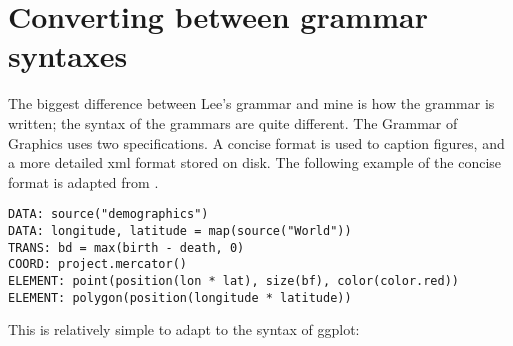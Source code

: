 
\section{Converting between grammar syntaxes}

The biggest difference between Lee's grammar and mine is how the grammar is written; the syntax of the grammars are quite different.  The Grammar of Graphics uses two specifications.  A concise format is used to caption figures, and a more detailed xml format stored on disk.  The following example of the concise format is adapted from \citet[][Figure 1.5, page 13]{wilkinson:2006}.

\begin{verbatim}
DATA: source("demographics")
DATA: longitude, latitude = map(source("World"))
TRANS: bd = max(birth - death, 0)
COORD: project.mercator()
ELEMENT: point(position(lon * lat), size(bf), color(color.red))
ELEMENT: polygon(position(longitude * latitude))
\end{verbatim}

This is relatively simple to adapt to the syntax of ggplot:

